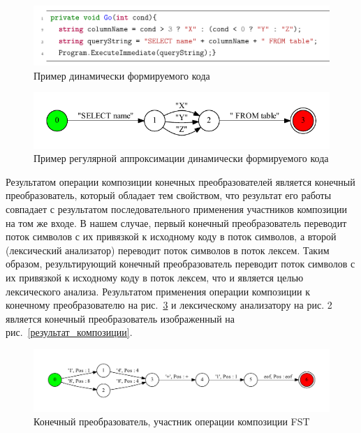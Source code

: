\documentclass[14pt]{matmex-diploma}
\begin{document}
\begin{figure}[h]
\centering
\includegraphics{pictures/approx_code.pdf}
\caption{Пример динамически формируемого кода}
\label{пример_кода_2}
\end{figure}

\begin{figure}[h]
\centering
\includegraphics{pictures/approx_fsa.pdf}
\caption{Пример регулярной аппроксимации динамически формируемого кода}
\label{пример_регулярной_аппроксимации}
\end{figure}

Результатом операции композиции конечных преобразователей является конечный преобразователь, который обладает тем свойством, что результат его работы совпадает с результатом последовательного применения участников композиции на том же входе. В нашем случае, первый конечный преобразователь переводит поток символов с их привязкой к исходному коду в поток символов, а второй (лексический анализатор) переводит поток символов в поток лексем. Таким образом, результирующий конечный преобразователь переводит поток символов с их привязкой к исходному коду в поток лексем, что и является целью лексического анализа. Результатом применения операции композиции к конечному преобразователю на рис.~\ref{участник_композиции} и лексическому анализатору на рис. 2 является конечный преобразователь изображенный на рис.~\ref{результат_композиции}.

\begin{figure}[h]
\centering
\includegraphics[width=16cm]{pictures/example_.pdf}
\caption{Конечный преобразователь, участник операции композиции FST}
\label{участник_композиции}
\end{figure}
\end{document}
